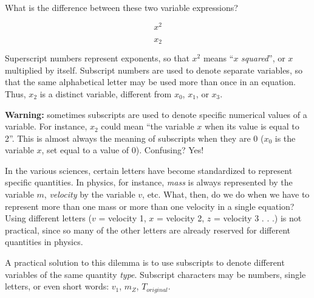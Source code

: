 

What is the difference between these two variable expressions?

$$x^2$$

$$x_2$$







Superscript numbers represent exponents, so that $x^2$ means ``$x$ {\it squared}'', or $x$ multiplied by itself.  Subscript numbers are used to denote separate variables, so that the same alphabetical letter may be used more than once in an equation.  Thus, $x_2$ is a distinct variable, different from $x_0$, $x_1$, or $x_3$.

\vskip 10pt

{\bf Warning:} sometimes subscripts are used to denote specific numerical values of a variable.  For instance, $x_2$ could mean ``the variable $x$ when its value is equal to 2''.  This is almost always the meaning of subscripts when they are 0 ($x_0$ is the variable $x$, set equal to a value of 0).  Confusing?  Yes!







In the various sciences, certain letters have become standardized to represent specific quantities.  In physics, for instance, {\it mass} is always represented by the variable $m$, {\it velocity} by the variable $v$, etc.  What, then, do we do when we have to represent more than one mass or more than one velocity in a single equation?  Using different letters ($v$ = velocity 1, $x$ = velocity 2, $z$ = velocity 3 . . .) is not practical, since so many of the other letters are already reserved for different quantities in physics. 

A practical solution to this dilemma is to use subscripts to denote different variables of the same quantity {\it type}.  Subscript characters may be numbers, single letters, or even short words: $v_1$, $m_Z$, $T_{original}$.




